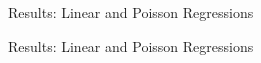 \begin{frame}{Results: Linear and Poisson Regressions}
    
\end{frame}
\begin{frame}{Results: Linear and Poisson Regressions}
	
\end{frame}
